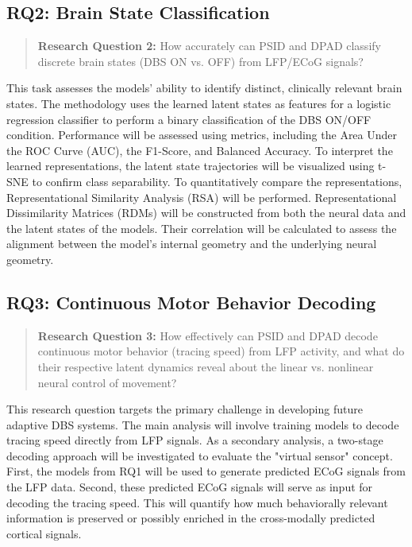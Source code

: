 \documentclass[12pt, a4paper]{article}
\begin{document}
\subsection{RQ2: Brain State Classification}

\begin{quote}

    \textbf{Research Question 2:} How accurately can PSID and DPAD classify discrete brain states (DBS ON vs. OFF) from LFP/ECoG signals?

\end{quote}

This task assesses the models' ability to identify distinct, clinically relevant brain states. The methodology uses the learned latent states as features for a logistic regression classifier to perform a binary classification of the DBS ON/OFF condition. Performance will be assessed using metrics, including the Area Under the ROC Curve (AUC), the F1-Score, and Balanced Accuracy. To interpret the learned representations, the latent state trajectories will be visualized using t-SNE to confirm class separability. To quantitatively compare the representations, Representational Similarity Analysis (RSA) will be performed. Representational Dissimilarity Matrices (RDMs) will be constructed from both the neural data and the latent states of the models. Their correlation will be calculated to assess the alignment between the model's internal geometry and the underlying neural geometry.


\subsection{RQ3: Continuous Motor Behavior Decoding}
\begin{quote}
    \textbf{Research Question 3:} How effectively can PSID and DPAD decode continuous motor behavior (tracing speed) from LFP activity, and what do their respective latent dynamics reveal about the linear vs. nonlinear neural control of movement?
\end{quote}

This research question targets the primary challenge in developing future adaptive DBS systems. The main analysis will involve training models to decode tracing speed directly from LFP signals. As a secondary analysis, a two-stage decoding approach will be investigated to evaluate the "virtual sensor" concept. First, the models from RQ1 will be used to generate predicted ECoG signals from the LFP data. Second, these predicted ECoG signals will serve as input for decoding the tracing speed. This will quantify how much behaviorally relevant information is preserved or possibly enriched in the cross-modally predicted cortical signals.
\end{document}
